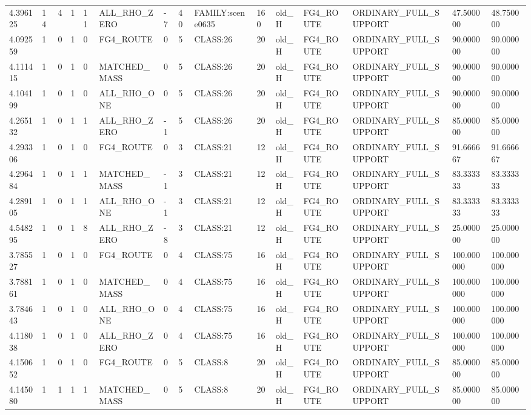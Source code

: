 \begin{tabular}{lllllllllllllll}
4.396125 & 14 & 4 & 1 & 11 & ALL\_RHO\_ZERO & -7 & 40 & FAMILY:scene0635 & 160 & old\_H & FG4\_ROUTE & ORDINARY\_FULL\_SUPPORT & 47.500000 & 48.750000 \\
4.092559 & 1 & 0 & 1 & 0 & FG4\_ROUTE & 0 & 5 & CLASS:26 & 20 & old\_H & FG4\_ROUTE & ORDINARY\_FULL\_SUPPORT & 90.000000 & 90.000000 \\
4.111415 & 1 & 0 & 1 & 0 & MATCHED\_MASS & 0 & 5 & CLASS:26 & 20 & old\_H & FG4\_ROUTE & ORDINARY\_FULL\_SUPPORT & 90.000000 & 90.000000 \\
4.104199 & 1 & 0 & 1 & 0 & ALL\_RHO\_ONE & 0 & 5 & CLASS:26 & 20 & old\_H & FG4\_ROUTE & ORDINARY\_FULL\_SUPPORT & 90.000000 & 90.000000 \\
4.265132 & 1 & 0 & 1 & 1 & ALL\_RHO\_ZERO & -1 & 5 & CLASS:26 & 20 & old\_H & FG4\_ROUTE & ORDINARY\_FULL\_SUPPORT & 85.000000 & 85.000000 \\
4.293306 & 1 & 0 & 1 & 0 & FG4\_ROUTE & 0 & 3 & CLASS:21 & 12 & old\_H & FG4\_ROUTE & ORDINARY\_FULL\_SUPPORT & 91.666667 & 91.666667 \\
4.296484 & 1 & 0 & 1 & 1 & MATCHED\_MASS & -1 & 3 & CLASS:21 & 12 & old\_H & FG4\_ROUTE & ORDINARY\_FULL\_SUPPORT & 83.333333 & 83.333333 \\
4.289105 & 1 & 0 & 1 & 1 & ALL\_RHO\_ONE & -1 & 3 & CLASS:21 & 12 & old\_H & FG4\_ROUTE & ORDINARY\_FULL\_SUPPORT & 83.333333 & 83.333333 \\
4.548295 & 1 & 0 & 1 & 8 & ALL\_RHO\_ZERO & -8 & 3 & CLASS:21 & 12 & old\_H & FG4\_ROUTE & ORDINARY\_FULL\_SUPPORT & 25.000000 & 25.000000 \\
3.785527 & 1 & 0 & 1 & 0 & FG4\_ROUTE & 0 & 4 & CLASS:75 & 16 & old\_H & FG4\_ROUTE & ORDINARY\_FULL\_SUPPORT & 100.000000 & 100.000000 \\
3.788161 & 1 & 0 & 1 & 0 & MATCHED\_MASS & 0 & 4 & CLASS:75 & 16 & old\_H & FG4\_ROUTE & ORDINARY\_FULL\_SUPPORT & 100.000000 & 100.000000 \\
3.784643 & 1 & 0 & 1 & 0 & ALL\_RHO\_ONE & 0 & 4 & CLASS:75 & 16 & old\_H & FG4\_ROUTE & ORDINARY\_FULL\_SUPPORT & 100.000000 & 100.000000 \\
4.118038 & 1 & 0 & 1 & 0 & ALL\_RHO\_ZERO & 0 & 4 & CLASS:75 & 16 & old\_H & FG4\_ROUTE & ORDINARY\_FULL\_SUPPORT & 100.000000 & 100.000000 \\
4.150652 & 1 & 0 & 1 & 0 & FG4\_ROUTE & 0 & 5 & CLASS:8 & 20 & old\_H & FG4\_ROUTE & ORDINARY\_FULL\_SUPPORT & 85.000000 & 85.000000 \\
4.145080 & 1 & 1 & 1 & 1 & MATCHED\_MASS & 0 & 5 & CLASS:8 & 20 & old\_H & FG4\_ROUTE & ORDINARY\_FULL\_SUPPORT & 85.000000 & 85.000000 \\

\end{tabular}
